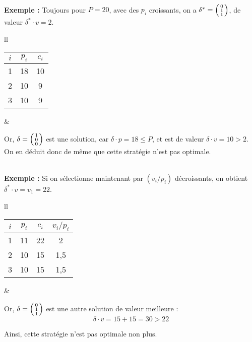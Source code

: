 \documentclass{scrartcl}
\newcommand{\elt}[1]{\textbf{#1}}
\newcommand{\dotp}{\! \cdot \!}
\newcommand{\nl}{\\[5mm]}
\newcommand{\1}{\bbm{1}}
\begin{document}
				\nl
			\elt{Exemple :} Toujours pour $P = 20$, avec des $p_i$ croissants, on a \( \delta^* = \begin{psmallmatrix} 0 \\ 1 \\ 1 \end{psmallmatrix} \), de valeur $\delta^* \! \dotp v = 2$.
			\\[-3mm]
				\begin{tabular}[t]{ll}
					\begin{tabular}[t]{| c | c | c |}
						\hline
						$i$ & $p_i$ & $c_i$ \\ \hline
						1 & 18 & 10 \\ \hline
						2 & 10 & 9 \\ \hline
						3 & 10 & 9 \\ \hline
					\end{tabular}
					&
					\parbox[t]{140mm}{
						\vspace{1mm}
						Or, \( \delta = \begin{psmallmatrix} 1 \\ 0 \\ 0 \end{psmallmatrix} \) est une solution, car \( \delta \dotp p = 18 \leq P \), et est de valeur \( \delta \dotp v = 10 > 2 \).
							\\[2mm]
						On en déduit donc de même que cette stratégie n'est pas optimale.
						\hspace{-8mm}
					}
				\end{tabular}
				\nl
			\elt{Exemple :} Si on sélectionne maintenant par $(v_i / p_i)$ décroissants, on obtient $\delta^* \! \dotp v = v_1 = 22$.
			\\[-1mm]
			\begin{tabular}[t]{ll}
				\begin{tabular}[t]{| c | c | c | c |}
					\hline
					$i$ & $p_i$ & $c_i$ & $v_i/p_i$\\ \hline
					1 & 11 & 22 & 2\\ \hline
					2 & 10 & 15 & 1,5 \\ \hline
					3 & 10 & 15 & 1,5 \\ \hline
				\end{tabular}
				&
				\parbox[t]{130mm}{
					\vspace{1mm}
					Or, \( \delta = \begin{psmallmatrix} 0 \\ 1 \\ 1 \end{psmallmatrix} \) est une autre solution de valeur meilleure :
						\vspace{-5mm}
						\[ \delta \dotp v = 15 + 15 = 30 > 22 \]
						
					\vspace{-3mm}
					Ainsi, cette stratégie n'est pas optimale non plus.
				}
			\end{tabular}
\end{document}
